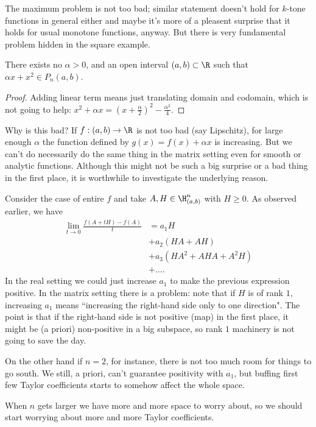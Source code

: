 The maximum problem is not too bad; similar statement doesn't hold for $k$-tone functions in general either and maybe it's more of a pleasent surprise that it holds for usual monotone functions, anyway. But there is very fundamental problem hidden in the square example.

\begin{prop}
	There exists no $\alpha > 0$, and an open interval $(a, b) \subset \R$ such that $\alpha x + x^{2} \in P_{n}(a, b)$.
\end{prop}
\begin{proof}
	Adding linear term means just translating domain and codomain, which is not going to help: $x^2 + \alpha x = (x + \frac{\alpha}{2})^2 - \frac{\alpha^2}{4}$.
\end{proof}

Why is this bad? If $f : (a, b) \to \R$ is not too bad (say Lipschitz), for large enough $\alpha$ the function defined by $g(x) = f(x) + \alpha x$ is increasing. But we can't do necessarily do the same thing in the matrix setting even for smooth or analytic functions. Although this might not be such a big surprise or a bad thing in the first place, it is worthwhile to investigate the underlying reason.

Consider the case of entire $f$ and take $A, H \in \H^{n}_{(a, b)}$ with $H \geq 0$. As observed earlier, we have
\begin{align*}
	\lim_{t \to 0} \frac{f(A + t H) - f(A)}{t} &= a_{1} H \\
	&+ a_{2} (H A + A H) \\
	&+ a_{3} (H A^2 + A H A + A^2 H) \\
	&+ \ldots.
\end{align*}
In the real setting we could just increase $a_{1}$ to make the previous expression positive. In the matrix setting there is a problem: note that if $H$ is of rank $1$, increasing $a_{1}$ means ``increasing the right-hand side only to one direction". The point is that if the right-hand side is not positive (map) in the first place, it might be (a priori) non-positive in a big subspace, so rank $1$ machinery is not going to save the day.

On the other hand if $n = 2$, for instance, there is not too much room for things to go south. We still, a priori, can't guarantee positivity with $a_{1}$, but buffing first few Taylor coefficients starts to somehow affect the whole space.

When $n$ gets larger we have more and more space to worry about, so we should start worrying about more and more Taylor coefficients.

